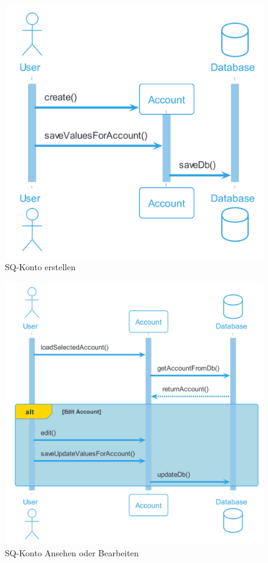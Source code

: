 \begin{figure}[H]
  \begin{center}
    \includegraphics[width=0.5\textheight]{content/diagrams/out/sequenzdiagram/kontoErstellen/KontoErstellen.png}
    \caption{SQ-Konto erstellen}

  \end{center}
\end{figure}

\begin{figure}[H]
  \begin{center}
    \includegraphics[width=0.6\textheight]{content/diagrams/out/sequenzdiagram/kontoAnsehenBearbeiten/KontoAnsehenBearbeiten.png}
    \caption{SQ-Konto Ansehen oder Bearbeiten}
  \end{center}
\end{figure}

